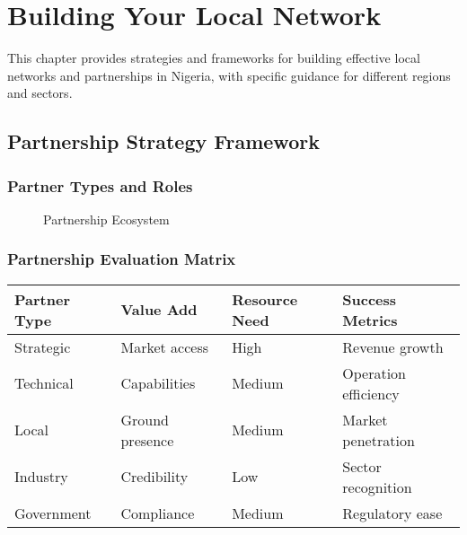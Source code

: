 
\chapter{Building Your Local Network}

\begin{importantbox}
This chapter provides strategies and frameworks for building effective local networks and partnerships in Nigeria, with specific guidance for different regions and sectors.
\end{importantbox}

\section{Partnership Strategy Framework}

\FloatBarrier
\subsection{Partner Types and Roles}
\begin{figure}[htbp]
    \centering
    \caption{Partnership Ecosystem}
    \label{fig:partnership-ecosystem}
\end{figure}

\subsection{Partnership Evaluation Matrix}
\begin{center}
\begin{tabularx}{\textwidth}{>{\raggedright\arraybackslash}X >{\centering\arraybackslash}X >{\centering\arraybackslash}X >{\raggedright\arraybackslash}X}
    \toprule
    \textbf{Partner Type} & \textbf{Value Add} & \textbf{Resource Need} & \textbf{Success Metrics} \\
    \midrule
    Strategic & Market access & High & Revenue growth \\
    Technical & Capabilities & Medium & Operation efficiency \\
    Local & Ground presence & Medium & Market penetration \\
    Industry & Credibility & Low & Sector recognition \\
    Government & Compliance & Medium & Regulatory ease \\
    \bottomrule
\end{tabularx}
\end{center}

